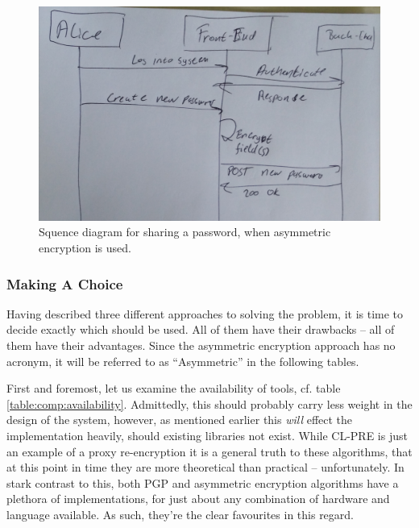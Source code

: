 				\begin{figure}[h!]
					\centering
					\includegraphics[width=\textwidth]{figures/design/sequence_perEntry.png}
					\caption{Squence diagram for sharing a password, when asymmetric encryption is used.}
					\label{fig:sequence:asymmetric}
				\end{figure}



			\subsubsection{Making A Choice}
				\label{sec:encryption_choice}
				Having described three different approaches to solving the problem, it is time to decide exactly which should be used. All of them have their drawbacks -- all of them have their advantages. Since the asymmetric encryption approach has no acronym, it will be referred to as ``Asymmetric'' in the following tables.

				First and foremost, let us examine the availability of tools, cf. table \ref{table:comp:availability}. Admittedly, this should probably carry less weight in the design of the system, however, as mentioned earlier this \emph{will} effect the implementation heavily, should existing libraries not exist. While CL-PRE is just an example of a proxy re-encryption it is a general truth to these algorithms, that at this point in time they are more theoretical than practical -- unfortunately. In stark contrast to this, both PGP and asymmetric encryption algorithms have a plethora of implementations, for just about any combination of hardware and language available. As such, they're the clear favourites in this regard.

